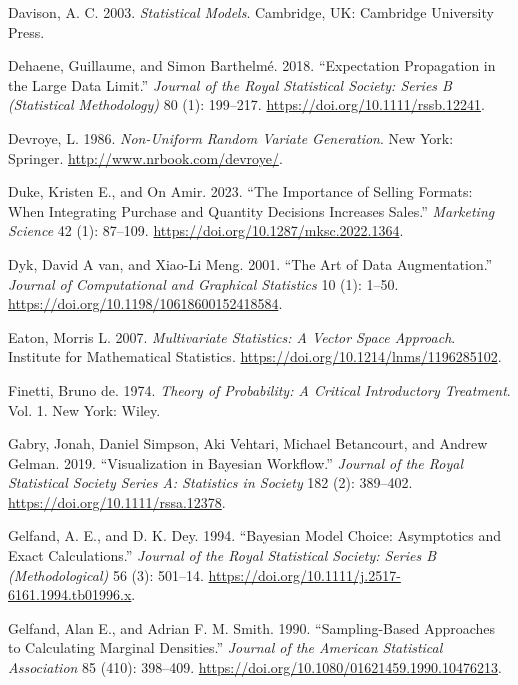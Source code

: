 \documentclass[
  11pt,
  letterpaper,
]{scrbook}
\newlength{\cslhangindent}
\newenvironment{CSLReferences}[2] %
 {\begin{list}{}{%
  \setlength{\itemindent}{0pt}
  \setlength{\leftmargin}{0pt}
  \setlength{\parsep}{0pt}
  \ifodd #1
   \setlength{\leftmargin}{\cslhangindent}
   \setlength{\itemindent}{-1\cslhangindent}
  \fi
  \setlength{\itemsep}{#2\baselineskip}}}
 {\end{list}}
\theoremstyle{plain}
\theoremstyle{plain}
\theoremstyle{plain}
\theoremstyle{definition}
\theoremstyle{definition}
\theoremstyle{definition}
\theoremstyle{remark}
\begin{document}
\begin{CSLReferences}{1}{0}
Davison, A. C. 2003. \emph{Statistical Models}. Cambridge, UK: Cambridge
University Press.

Dehaene, Guillaume, and Simon Barthelmé. 2018. {``Expectation
Propagation in the Large Data Limit.''} \emph{Journal of the Royal
Statistical Society: Series B (Statistical Methodology)} 80 (1):
199--217. \url{https://doi.org/10.1111/rssb.12241}.

Devroye, L. 1986. \emph{Non-Uniform Random Variate Generation}. New
York: Springer. \url{http://www.nrbook.com/devroye/}.

Duke, Kristen E., and On Amir. 2023. {``The Importance of Selling
Formats: When Integrating Purchase and Quantity Decisions Increases
Sales.''} \emph{Marketing Science} 42 (1): 87--109.
\url{https://doi.org/10.1287/mksc.2022.1364}.

Dyk, David A van, and Xiao-Li Meng. 2001. {``The Art of Data
Augmentation.''} \emph{Journal of Computational and Graphical
Statistics} 10 (1): 1--50.
\url{https://doi.org/10.1198/10618600152418584}.

Eaton, Morris L. 2007. \emph{Multivariate Statistics: A Vector Space
Approach}. Institute for Mathematical Statistics.
\url{https://doi.org/10.1214/lnms/1196285102}.

Finetti, Bruno de. 1974. \emph{Theory of Probability: A Critical
Introductory Treatment}. Vol. 1. New York: Wiley.

Gabry, Jonah, Daniel Simpson, Aki Vehtari, Michael Betancourt, and
Andrew Gelman. 2019. {``{Visualization in {B}ayesian Workflow}.''}
\emph{Journal of the Royal Statistical Society Series A: Statistics in
Society} 182 (2): 389--402. \url{https://doi.org/10.1111/rssa.12378}.

Gelfand, A. E., and D. K. Dey. 1994. {``Bayesian Model Choice:
Asymptotics and Exact Calculations.''} \emph{Journal of the Royal
Statistical Society: Series B (Methodological)} 56 (3): 501--14.
\url{https://doi.org/10.1111/j.2517-6161.1994.tb01996.x}.

Gelfand, Alan E., and Adrian F. M. Smith. 1990. {``Sampling-Based
Approaches to Calculating Marginal Densities.''} \emph{Journal of the
American Statistical Association} 85 (410): 398--409.
\url{https://doi.org/10.1080/01621459.1990.10476213}.


\end{CSLReferences}
\end{document}
